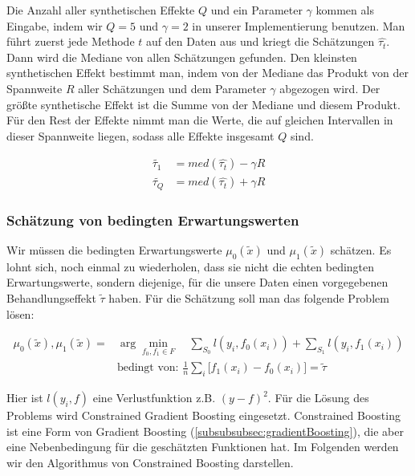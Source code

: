\documentclass[12pt,a4paper,twoside]{scrartcl}
\numberwithin{equation}{section}
\begin{document}
\noindent
Die Anzahl aller synthetischen Effekte $Q$ und ein Parameter $\gamma$ kommen als Eingabe, indem wir $Q=5$ und $\gamma = 2$ in unserer Implementierung benutzen. Man führt zuerst jede Methode $t$ auf den Daten aus und kriegt die Schätzungen $\hat{\tau_t}$. Dann wird die Mediane von allen Schätzungen gefunden. Den kleinsten synthetischen Effekt bestimmt man, indem von der Mediane das Produkt von der Spannweite $R$ aller Schätzungen und dem Parameter $\gamma$ abgezogen wird. Der größte synthetische Effekt ist die Summe von der Mediane und diesem Produkt. Für den Rest der Effekte nimmt man die Werte, die auf gleichen Intervallen in dieser Spannweite liegen, sodass alle Effekte insgesamt $Q$ sind\cite{schuler2017synth}.

\begin{equation}\label{eq:3.5}
\begin{split}
 \tilde{\tau_1} &= med(\hat{\tau_t}) - \gamma R\\
 \tilde{\tau_Q} &= med(\hat{\tau_t}) + \gamma R
\end{split}
\end{equation}
	
\subsubsection{Schätzung von bedingten Erwartungswerten}\label{subsubsec:schätzungBedingtenErwartungswerten}
Wir müssen die bedingten Erwartungswerte $\mu_0(\tilde{x})$ und $\mu_1(\tilde{x})$ schätzen. Es lohnt sich, noch einmal zu wiederholen, dass sie nicht die echten bedingten Erwartungswerte, sondern diejenige, für die unsere Daten einen vorgegebenen Behandlungseffekt $\tilde{\tau}$ haben. Für die Schätzung soll man das folgende Problem lösen\cite{schuler2017synth}:\par

\begin{equation}\label{eq:3.6}
\begin{split}
 \mu_0(\tilde{x}),\mu_1(\tilde{x}) = &\arg\min_{f_0,f_1 \in F} \quad \sum_{S_0} l(y_i,f_0(x_i)) + \sum_{S_1} l(y_i,f_1(x_i))\\
 &\text{bedingt von: } \frac{1}{n} \sum_i \big [f_1(x_i) - f_0(x_i) \big ] = \tilde{\tau}
\end{split}
\end{equation}

\noindent
Hier ist $l(y_i,f)$  eine Verlustfunktion z.B. $(y-f)^2$. Für die Lösung des Problems wird Constrained Gradient Boosting eingesetzt. Constrained Boosting ist eine Form von Gradient Boosting (\ref{subsubsubsec:gradientBoosting}), die aber eine Nebenbedingung für die geschätzten Funktionen hat. Im Folgenden werden wir den Algorithmus von Constrained Boosting darstellen\cite{schuler2017synth}.\par
 
\end{document}
